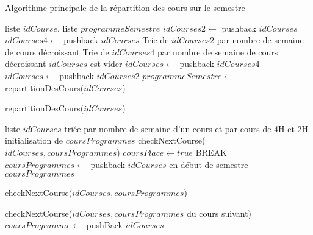 \documentclass[12pt,a4paper,french]{article}
\begin{document}
\begin{algorithm}
\caption{Algorithme principale de la répartition des cours sur le semestre}
\begin{algorithmic}
\REQUIRE liste $idCourse$, liste $programmeSemestre$
\STATE $idCourses2 \leftarrow$ pushback $idCourses$
\ELSE
\STATE $idCourses4 \leftarrow$ pushback $idCourses$
\ENDIF
\ENDFOR
\STATE Trie de $idCourses2$ par nombre de semaine de cours décroissant
\STATE Trie de $idCourses4$ par nombre de semaine de cours décroissant
\STATE $idCourses$ est vider
\STATE $idCourses \leftarrow$ pushback $idCourses4$
\STATE $idCourses \leftarrow$ pushback $idCourses2$
\STATE $programmeSemestre \leftarrow$ repartitionDesCours($idCourses$)
\end{algorithmic}
\end{algorithm}

\begin{algorithm}
\caption{repartitionDesCours($idCourses$)}
\begin {algorithmic}
\REQUIRE liste $idCourses$ triée par nombre de semaine d'un cours et par cours de 4H et 2H
\STATE initialisation de $coursProgrammes$
\STATE checkNextCourse($idCourses, coursProgrammes$)
\STATE $coursPlace \leftarrow true$
\STATE BREAK
\ENDIF
\ENDIF
\ENDFOR
{}
\STATE $coursProgrammes \leftarrow$ pushback $idCourses$ en début de semestre
\ENDIF
\ENDFOR
\RETURN $coursProgrammes$
\end{algorithmic}
\end{algorithm}

\begin{algorithm}
\caption{checkNextCourse($idCourses, coursProgrammes$)}
\begin {algorithmic}
\STATE checkNextCourse($idCourses, coursProgrammes$ du cours suivant)
\STATE $coursProgramme \leftarrow$ pushBack $idCourses$
\ENDIF
\end{algorithmic}
\end{algorithm}
\end{document}
